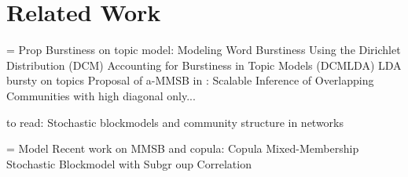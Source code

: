 \section{Related Work}
= Prop
Burstiness on topic model:
Modeling Word Burstiness Using the Dirichlet Distribution (DCM)
Accounting for Burstiness in Topic Models (DCMLDA)
LDA bursty on topics
Proposal of a-MMSB in : Scalable Inference of Overlapping Communities
with high diagonal only...

to read: Stochastic blockmodels and community structure in networks


= Model
Recent work on MMSB and copula: Copula Mixed-Membership Stochastic Blockmodel with Subgr
oup Correlation


